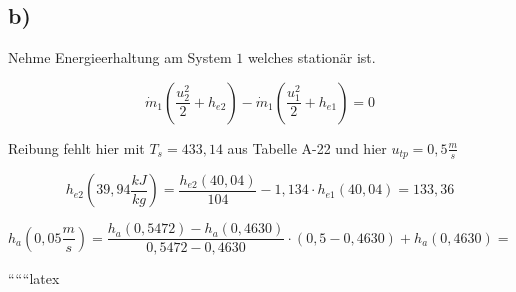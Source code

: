 

\subsection*{b)}

Nehme Energieerhaltung am System \(1\) welches stationär ist.

\[
\dot{m}_1 \left( \frac{u_2^2}{2} + h_{e2} \right) - \dot{m}_1 \left( \frac{u_1^2}{2} + h_{e1} \right) = 0
\]

Reibung fehlt hier mit \(T_s = 433,14\) aus Tabelle A-22 und hier \(u_{tp} = 0,5 \frac{m}{s}\)

\[
h_{e2}(39,94 \frac{kJ}{kg}) = \frac{h_{e2}(40,04)}{104} - 1,134 \cdot h_{e1}(40,04) = 133,36
\]

\[
h_{a}(0,05 \frac{m}{s}) = \frac{h_{a}(0,5472) - h_{a}(0,4630)}{0,5472 - 0,4630} \cdot (0,5 - 0,4630) + h_{a}(0,4630) =
\]

``````latex